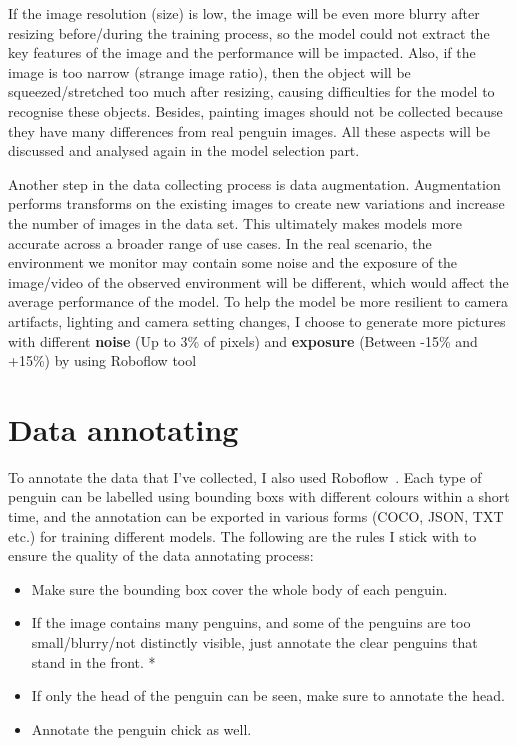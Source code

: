 \documentclass[runningheads]{llncs}
\begin{document}
If the image resolution (size) is low, the image will be even more blurry after resizing before/during the training process, so the model could not extract the key features of the image and the performance will be impacted. Also, if the image is too narrow (strange image ratio), then the object will be squeezed/stretched too much after resizing, causing difficulties for the model to recognise these objects. Besides, painting images should not be collected because they have many differences from real penguin images. All these aspects will be discussed and analysed again in the model selection part.

Another step in the data collecting process is data augmentation. Augmentation performs transforms on the existing images to create new variations and increase the number of images in the data set. This ultimately makes models more accurate across a broader range of use cases. 
In the real scenario, the environment we monitor may contain some noise and the exposure of the image/video of the observed environment will be different, which would affect the average performance of the model. To help the model be more resilient to camera artifacts, lighting and camera setting changes, I choose to generate more pictures with different \textbf{noise} (Up to 3\% of pixels) and \textbf{exposure} (Between -15\% and +15\%) by using Roboflow tool~\cite{ref_roboflow}


\section{Data annotating}
To annotate the data that I've collected, I also used Roboflow~\cite{ref_roboflow}. Each type of penguin can be labelled using bounding boxs with different colours within a short time, and the annotation can be exported in various forms (COCO, JSON, TXT etc.) for training different models. The following are the rules I stick with to ensure the quality of the data annotating process:

\begin{itemize}
  \item Make sure the bounding box cover the whole body of each penguin.
  \item If the image contains many penguins, and some of the penguins are too small/blurry/not distinctly visible, just annotate the clear penguins that stand in the front. *
  \item If only the head of the penguin can be seen, make sure to annotate the head.
  \item Annotate the penguin chick as well.
\end{itemize}
\end{document}
